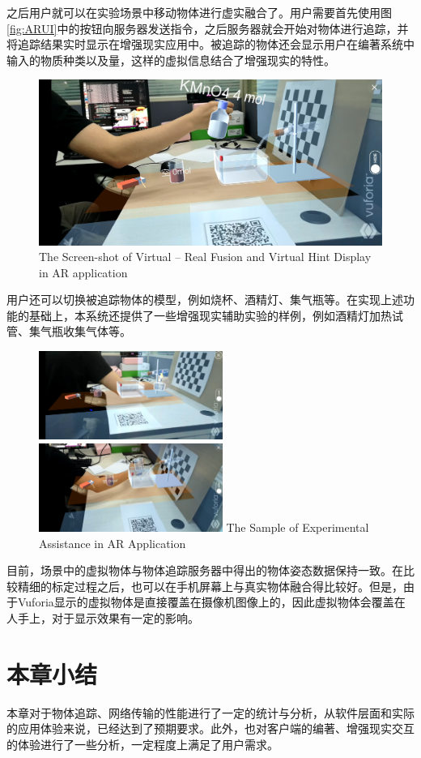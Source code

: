 之后用户就可以在实验场景中移动物体进行虚实融合了。用户需要首先使用图\ref{fig:ARUI}中的按钮向服务器发送指令，之后服务器就会开始对物体进行追踪，并将追踪结果实时显示在增强现实应用中。被追踪的物体还会显示用户在编著系统中输入的物质种类以及量，这样的虚拟信息结合了增强现实的特性。

\begin{figure}[!htp]
  \centering
  \includegraphics[width=12cm]{figure/moving.jpg}
    {The Screen-shot of Virtual – Real Fusion and Virtual Hint Display in AR application }
 \label{fig:mAR}
\end{figure}

用户还可以切换被追踪物体的模型，例如烧杯、酒精灯、集气瓶等。在实现上述功能的基础上，本系统还提供了一些增强现实辅助实验的样例，例如酒精灯加热试管、集气瓶收集气体等。

\begin{figure}[!htp]
  \centering
  \includegraphics[width=6cm]{figure/heating.jpg}
    \hspace{1cm}
  \includegraphics[width=6cm]{figure/gatheringGas.jpg}
    {The Sample of Experimental Assistance in AR Application}
 \label{fig:comp}
\end{figure}

目前，场景中的虚拟物体与物体追踪服务器中得出的物体姿态数据保持一致。在比较精细的标定过程之后，也可以在手机屏幕上与真实物体融合得比较好。但是，由于Vuforia显示的虚拟物体是直接覆盖在摄像机图像上的，因此虚拟物体会覆盖在人手上，对于显示效果有一定的影响。

\section{本章小结}
本章对于物体追踪、网络传输的性能进行了一定的统计与分析，从软件层面和实际的应用体验来说，已经达到了预期要求。此外，也对客户端的编著、增强现实交互的体验进行了一些分析，一定程度上满足了用户需求。